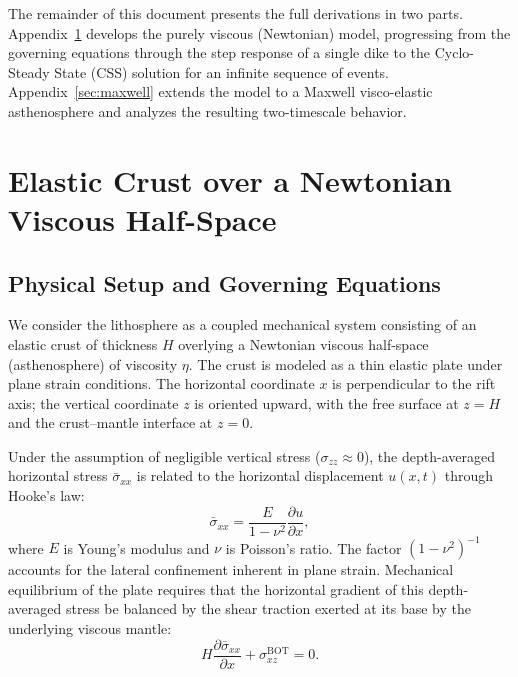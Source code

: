\documentclass{article}
\begin{document}
The remainder of this document presents the full derivations in two parts.
Appendix~\ref{sec:viscous} develops the purely viscous (Newtonian) model,
progressing from the governing equations through the step response of a single
dike to the Cyclo-Steady State (CSS) solution for an infinite sequence of
events. Appendix~\ref{sec:maxwell} extends the model to a Maxwell visco-elastic
asthenosphere and analyzes the resulting two-timescale behavior.

\appendix

\section{Elastic Crust over a Newtonian Viscous Half-Space}
\label{sec:viscous}

\subsection{Physical Setup and Governing Equations}

We consider the lithosphere as a coupled mechanical system consisting of an
elastic crust of thickness $H$ overlying a Newtonian viscous half-space
(asthenosphere) of viscosity $\eta$. The crust is modeled as a thin elastic
plate under plane strain conditions. The horizontal coordinate $x$ is
perpendicular to the rift axis; the vertical coordinate $z$ is oriented
upward, with the free surface at $z=H$ and the crust--mantle interface at
$z=0$.

Under the assumption of negligible vertical stress ($\sigma_{zz}\approx 0$),
the depth-averaged horizontal stress $\bar{\sigma}_{xx}$ is related to the
horizontal displacement $u(x,t)$ through Hooke's law:
\begin{equation}
\bar{\sigma}_{xx} = \frac{E}{1-\nu^2}\frac{\partial u}{\partial x},
\label{A1}
\end{equation}
where $E$ is Young's modulus and $\nu$ is Poisson's ratio. The factor
$(1-\nu^2)^{-1}$ accounts for the lateral confinement inherent in plane
strain. Mechanical equilibrium of the plate requires that the horizontal
gradient of this depth-averaged stress be balanced by the shear traction
exerted at its base by the underlying viscous mantle:
\begin{equation}
H\frac{\partial\bar{\sigma}_{xx}}{\partial x} + \sigma_{xz}^{\text{BOT}} = 0.
\label{A2}
\end{equation}
\end{document}
